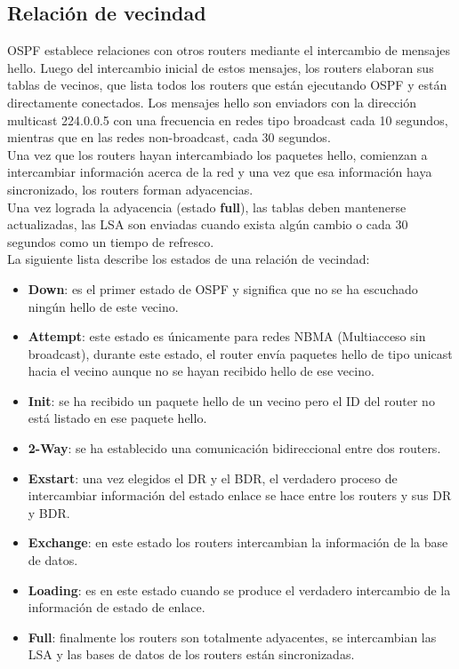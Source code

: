 \documentclass[12pt]{article}
\begin{document}
\subsection{Relación de vecindad}
OSPF establece relaciones con otros routers mediante el intercambio de mensajes hello. Luego del intercambio inicial de estos mensajes, los routers elaboran sus tablas de vecinos, que lista todos los routers que están ejecutando OSPF y están directamente conectados. Los mensajes hello son enviadors con la dirección multicast 224.0.0.5 con una frecuencia en redes tipo broadcast cada 10 segundos, mientras que en las redes non-broadcast, cada 30 segundos.\\

Una vez que los routers hayan intercambiado los paquetes hello, comienzan a intercambiar información acerca de la red y una vez que esa información haya sincronizado, los routers forman adyacencias.\\

Una vez lograda la adyacencia (estado \textbf{full}), las tablas deben mantenerse actualizadas, las LSA son enviadas cuando exista algún cambio o cada 30 segundos como un tiempo de refresco.\\
 
La siguiente lista describe los estados de una relación de vecindad:
\begin{itemize}
\item \textbf{Down}: es el primer estado de OSPF y significa que no se ha escuchado ningún hello de este vecino.\\
\item \textbf{Attempt}: este estado es únicamente para redes NBMA (Multiacceso sin broadcast), durante este estado, el router envía paquetes hello de tipo unicast hacia el vecino aunque no se hayan recibido hello de ese vecino.\\
\item \textbf{Init}: se ha recibido un paquete hello de un vecino pero el ID del router no está listado en ese paquete hello.\\
\item \textbf{2-Way}: se ha establecido una comunicación bidireccional entre dos routers.\\
\item \textbf{Exstart}: una vez elegidos el DR y el BDR, el verdadero proceso de intercambiar información del estado enlace se hace entre los routers y sus DR y BDR.\\
\item \textbf{Exchange}: en este estado los routers intercambian la información de la base de datos.\\
\item \textbf{Loading}: es en este estado cuando se produce el verdadero intercambio de la información de estado de enlace.\\
\item \textbf{Full}: finalmente los routers son totalmente adyacentes, se intercambian las LSA y las bases de datos de los routers están sincronizadas.\\
\end{itemize}
\end{document}
